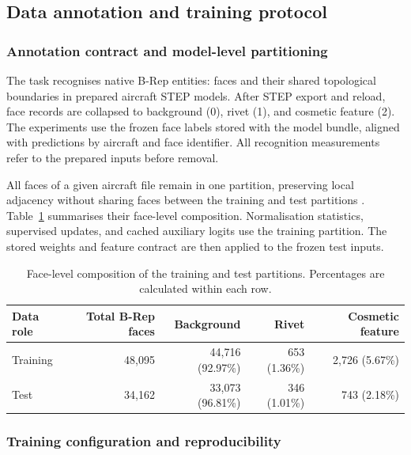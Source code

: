 \documentclass[12pt,a4paper]{article}
\begin{document}
\subsection{Data annotation and training protocol}\label{sec:data_training}

\subsubsection{Annotation contract and model-level partitioning}\label{sec:data_partition}

The task recognises native B-Rep entities: faces and their shared topological boundaries in prepared aircraft STEP models. After STEP export and reload, face records are collapsed to background (0), rivet (1), and cosmetic feature (2). The experiments use the frozen face labels stored with the model bundle, aligned with predictions by aircraft and face identifier. All recognition measurements refer to the prepared inputs before removal.

All faces of a given aircraft file remain in one partition, preserving local adjacency without sharing faces between the training and test partitions \parencite{kapoor2023leakage}. Table~\ref{tab:data_composition} summarises their face-level composition. Normalisation statistics, supervised updates, and cached auxiliary logits use the training partition. The stored weights and feature contract are then applied to the frozen test inputs.

\begin{table}[!ht]
\centering
\footnotesize
\caption{Face-level composition of the training and test partitions. Percentages are calculated within each row.}\label{tab:data_composition}
\begin{tabular*}{\linewidth}{@{\extracolsep{\fill}}lrrrr@{}}
\toprule
Data role & Total B-Rep faces & Background & Rivet & Cosmetic feature \\
\midrule
Training & 48,095 & 44,716 (92.97\%) & 653 (1.36\%) & 2,726 (5.67\%) \\
Test & 34,162 & 33,073 (96.81\%) & 346 (1.01\%) & 743 (2.18\%) \\
\bottomrule
\end{tabular*}
\end{table}

\subsubsection{Training configuration and reproducibility}\label{sec:training_configuration}
\end{document}
